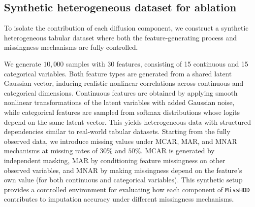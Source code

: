 \documentclass[times, review, 10pt]{elsarticle}
\begin{document}
\subsection{Synthetic heterogeneous dataset for ablation}

To isolate the contribution of each diffusion component, we construct a
synthetic heterogeneous tabular dataset where both the feature-generating
process and missingness mechanisms are fully controlled.

We generate $10{,}000$ samples with 30 features, consisting of 15 continuous
and 15 categorical variables. Both feature types are generated from a shared
latent Gaussian vector, inducing realistic nonlinear correlations across
continuous and categorical dimensions. Continuous features are obtained by applying smooth nonlinear transformations
of the latent variables with added Gaussian noise, while categorical features
are sampled from softmax distributions whose logits depend on the same latent
vector. This yields heterogeneous data with structured dependencies similar to
real-world tabular datasets. Starting from the fully observed data, we introduce missing values under MCAR, MAR, and MNAR mechanisms at missing rates of $30\%$ and $50\%$.
MCAR is generated by independent masking, MAR by conditioning feature
missingness on other observed variables, and MNAR by making missingness depend
on the feature’s own value (for both continuous and categorical variables). This synthetic setup provides a controlled environment for evaluating how each
component of \texttt{MissHDD} contributes to imputation accuracy under
different missingness mechanisms.





\end{document}
